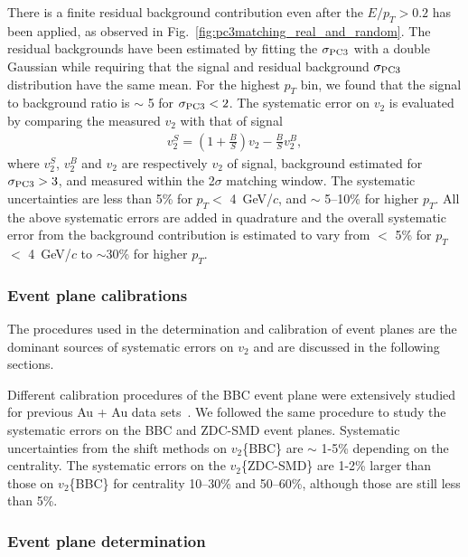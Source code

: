 \documentclass[aps,prc,superscriptaddress,showpacs,floatfix,twocolumn]{revtex4}
\newcommand \gevc{GeV/$c$\xspace}
\newcommand \pt{\mbox{$p_T$}\xspace}
\begin{document}
There is a finite residual background contribution even after 
the $E/\pt > 0.2$ has been applied, as observed in 
Fig.~\ref{fig:pc3matching_real_and_random}. The residual 
backgrounds have been estimated by fitting the $\sigma_{\rm 
PC3}$ with a double Gaussian while requiring that the signal and 
residual background $\sigma_{\rm PC3}$ distribution have the 
same mean. For the highest \pt bin, we found that the signal to 
background ratio is $\sim$ 5 for $\sigma_{\rm PC3} < 2$. The 
systematic error on $v_2$ is evaluated by comparing the measured 
$v_2$ with that of signal
\begin{eqnarray}
v_2^{S} = \left( 1+\frac{B}{S} \right)v_2 - \frac{B}{S}v_2^{B},
\end{eqnarray}
where $v_2^S$, $v_2^B$ and $v_2$ are respectively $v_2$ of 
signal, background estimated for $\sigma_{\rm PC3} > 3$, and 
measured within the 2$\sigma$ matching window. The systematic 
uncertainties are less than 5\% for \pt $<$ 4~\gevc, and $\sim$ 
5--10\% for higher \pt. All the above systematic errors are added 
in quadrature and the overall systematic error from the 
background contribution is estimated to vary from $<$ 5\% for 
\pt $<$ 4~\gevc to $\sim$30\% for higher \pt.

\subsubsection{Event plane calibrations}
\label{subsubsec:syserror_eventplane_calibrations}

The procedures used in the determination and calibration of 
event planes are the dominant sources of systematic errors on 
$v_2$ and are discussed in the following sections.


Different calibration procedures of the BBC event plane were 
extensively studied for previous Au + Au data 
sets~\cite{Adler:2003kt}. We followed the same procedure to 
study the systematic errors on the BBC and ZDC-SMD event planes. 
Systematic uncertainties from the shift methods on $v_2$\{BBC\} 
are $\sim$ 1-5\% depending on the centrality. The systematic 
errors on the $v_2$\{ZDC-SMD\} are 1-2\% larger than those on 
$v_2$\{BBC\} for centrality 10--30\% and 50--60\%, although 
those 
are still less than 5\%.

\subsubsection{Event plane determination}
\label{subsubsec:syserror_eventplane_determination}
\end{document}
